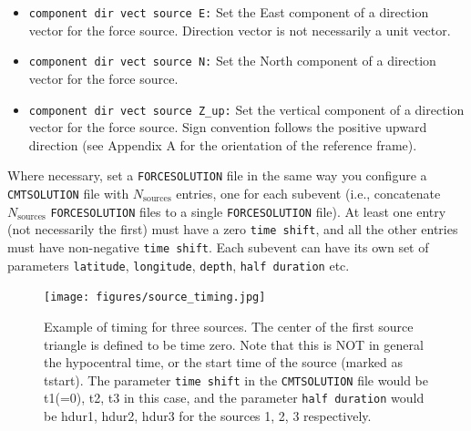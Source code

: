 \begin{itemize}
\item \texttt{component dir vect source E:} Set the East component of a direction vector for the force
source. Direction vector is not necessarily a unit vector.
\item \texttt{component dir vect source N:} Set the North component of a direction vector for the force
source.
\item \texttt{component dir vect source Z\_up:} Set the vertical component of a direction vector for the force
source. Sign convention follows the positive upward direction (see Appendix A for the orientation
of the reference frame).
\end{itemize}
\noindent Where necessary, set a \texttt{FORCESOLUTION} file in the
same way you configure a \texttt{CMTSOLUTION} file with $N_{\mathrm{sources}}$
entries, one for each subevent (i.e., concatenate $N_{\mathrm{sources}}$
\texttt{FORCESOLUTION} files to a single \texttt{FORCESOLUTION} file).
At least one entry (not necessarily the first) must have a zero \texttt{time
shift}, and all the other entries must have non-negative \texttt{time shift}.
Each subevent can have its own set of parameters \texttt{latitude}, \texttt{longitude}, \texttt{depth},
\texttt{half duration} etc.\newline

\begin{figure}[H]
\begin{centering}
\texttt{[image: figures/source\_timing.jpg]}
\par
\end{centering}
\caption{Example of timing for three sources. The center of the first source
triangle is defined to be time zero. Note that this is NOT in general
the hypocentral time, or the start time of the source (marked as tstart).
The parameter \texttt{time shift} in the \texttt{CMTSOLUTION} file
would be t1(=0), t2, t3 in this case, and the parameter \texttt{half
duration} would be hdur1, hdur2, hdur3 for the sources 1, 2, 3 respectively.}
{\small \label{fig:source_timing} }
\end{figure}

